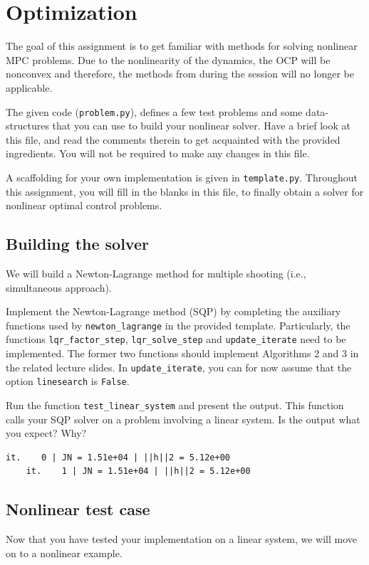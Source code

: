 \documentclass[]{article}
\begin{document}
\newpage 
\section{Optimization}

The goal of this assignment is to get familiar with methods for solving nonlinear MPC problems. 
Due to the nonlinearity of the dynamics, the OCP
will be nonconvex and therefore, the methods from during the session will no longer be applicable. 

The given code (\texttt{problem.py}), 
defines a few test problems and some data-structures that 
you can use to build your nonlinear solver. Have a brief 
look at this file, and read the comments therein
to get acquainted with the provided ingredients.
You will not be required to make any changes 
in this file.  

A scaffolding for your own implementation is given 
in \texttt{template.py}. Throughout this 
assignment, you will fill in the blanks in this file, 
to finally obtain a solver for nonlinear optimal control problems.

\subsection{Building the solver}
We will build a Newton-Lagrange method 
for multiple shooting (i.e., simultaneous approach).

\begin{assignment}
	Implement the Newton-Lagrange method (SQP) by 
	completing the auxiliary functions used by \texttt{newton\_lagrange} in 
	the provided template. Particularly, 
	the functions \texttt{lqr\_factor\_step}, \texttt{lqr\_solve\_step}
	and \texttt{update\_iterate} need to be implemented. The former two functions should implement 
	Algorithms 2 and 3 in the related lecture slides. 
	In \texttt{update\_iterate}, you can for now assume that the option \texttt{linesearch} is \texttt{False}.

	Run the function \texttt{test\_linear\_system} and present the output.
	This function calls your SQP solver on a problem involving 
	a linear system. Is the output what you expect? Why?
\end{assignment}
\begin{lstlisting}[style=python]
	it.    0 | JN = 1.51e+04 | ||h||2 = 5.12e+00
	it.    1 | JN = 1.51e+04 | ||h||2 = 5.12e+00
\end{lstlisting}


\subsection{Nonlinear test case}
Now that you have tested your implementation on a linear system,
we will move on to a nonlinear example.
\end{document}
